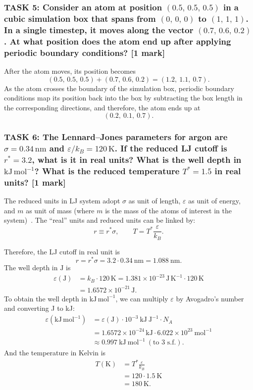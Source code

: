 \documentclass[a4paper,10pt,twocolumn]{article}
\begin{document}
\subsubsection*{TASK 5: Consider an atom at position $(0.5,\,0.5,\,0.5)$ in a cubic simulation box that spans from $(0,\,0,\,0)$ to $(1,\,1,\,1)$. In a single timestep, it moves along the vector $(0.7,\,0.6,\,0.2)$. At what position does the atom end up after applying periodic boundary conditions? [1 mark]}
After the atom moves, its position becomes
\[
(0.5,\,0.5,\,0.5)+ (0.7,\,0.6,\,0.2)=(1.2,\ 1.1,\ 0.7).
\] 
As the atom crosses the boundary of the simulation box, periodic boundary conditions map its position back into the box by subtracting the box length in the corresponding directions, and therefore, the atom ends up at
\[
(0.2,\ 0.1,\ 0.7).
\]
\subsubsection*{TASK 6: The Lennard--Jones parameters for argon are $\sigma = 0.34\,\mathrm{nm}$ and $\varepsilon/k_B = 120\,\mathrm{K}$. If the reduced LJ cutoff is $r^* = 3.2$, what is it in real units? What is the well depth in $\mathrm{kJ\,mol^{-1}}$? What is the reduced temperature $T^* = 1.5$ in real units? [1 mark]}
The reduced units in LJ system adopt $\sigma$ as unit of length, $\varepsilon$ as unit of energy, and $m$ as unit of mass (where $m$ is the mass of the atoms of interest in the system)~\cite{frenkel2023understanding}. The ``real'' units and reduced units can be linked by:
\[
r\equiv r^*\sigma,\qquad T=T^*\frac{\varepsilon}{k_B}.
\]

Therefore, the LJ cutoff in real unit is 
\[
r=r^*\sigma=3.2\cdot 0.34\ \mathrm{nm}=1.088\ \mathrm{nm}.
\]
The well depth in $\mathrm{J}$ is
\begin{align*}
\varepsilon(\mathrm{J}) &= k_B \cdot 120\,\mathrm{K} =1.381\times10^{-23}\,\mathrm{J\,K^{-1}}\cdot120\,\mathrm{K} 
\\
&=  1.6572\times10^{-21}\,\mathrm{J}.
\end{align*}
To obtain the well depth in $\mathrm{kJ\,mol^{-1}}$, we can multiply $\varepsilon$ by Avogadro's number and converting J to kJ:
\begin{align*}
\varepsilon(\mathrm{kJ\,mol^{-1}}) 
&= \varepsilon(\mathrm{J})\cdot10^{-3}\ \mathrm{kJ\ J^{-1}}\cdot N_A
\\
&=  1.6572\times10^{-24}\,\mathrm{kJ}\cdot 6.022\times10^{23}\ \mathrm{mol^{-1}}
\\
&\approx 0.997\ \mathrm{kJ\ mol^{-1}}\ (\text{to 3 s.f.}).
\end{align*}
And the temperature in Kelvin is
\begin{align*}
T(\mathrm{K}) &= T^*\frac{\varepsilon}{k_B}
\\
&=  120\cdot 1.5\ \mathrm{K}
\\
&= 180\ \mathrm{K}.
\end{align*}
\end{document}

